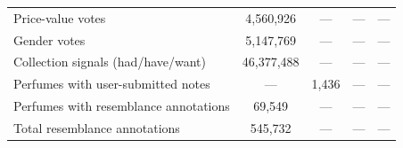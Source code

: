 \begin{table}[ht]
\begin{tabular}{lcccc}
Price-value votes & 4,560,926 & --- & --- & --- \\
Gender votes & 5,147,769 & --- & --- & --- \\
Collection signals (had/have/want) & 46,377,488 & --- & --- & --- \\
Perfumes with user-submitted notes & --- & 1,436 & --- & --- \\
Perfumes with resemblance annotations & 69,549 & --- & --- & --- \\
Total resemblance annotations & 545,732 & --- & --- & --- \\
\bottomrule
\end{tabular}
\end{table}